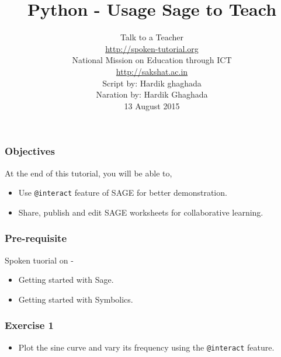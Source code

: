 \documentclass[17pt,compress]{beamer}
\author[FOSSEE]{}
\institute[IIT Bombay]{}
\date[]{}
\begin{document}
\sffamily \bfseries
\title
[Usage Sage to Teach]
{Python - Usage Sage to Teach}
\author
[FOSSEE, IIT - Bombay]
{\small Talk to a Teacher\\{\color{blue}\url{http://spoken-tutorial.org}}\\National Mission on Education
 through ICT\\{\color{blue}\url{http://sakshat.ac.in}} \\[0.5cm]{\tiny Script by: Hardik ghaghada \\ Naration by: Hardik Ghaghada \\ 13 August 2015}}

\begin{frame}
   \titlepage
\end{frame}
\begin{frame}
\frametitle{Objectives}
\label{sec-2}

 At the end of this tutorial, you will be able to,\pause

\begin{itemize}
\item Use \texttt{@interact} feature of SAGE for better demonstration.\pause
\item Share, publish and edit SAGE worksheets for collaborative learning.
\end{itemize}
\end{frame}
\begin{frame}
\frametitle{Pre-requisite}
\label{sec-3}

  Spoken tuorial on -

\begin{itemize}
\item Getting started with Sage.\pause
\item Getting started with Symbolics.
\end{itemize}
\end{frame}
\begin{frame}
\frametitle{Exercise 1}
\label{sec-4}


\begin{itemize}
\item Plot the sine curve and vary its frequency using the \texttt{@interact} feature.
\end{itemize}
\end{frame}
\end{document}
